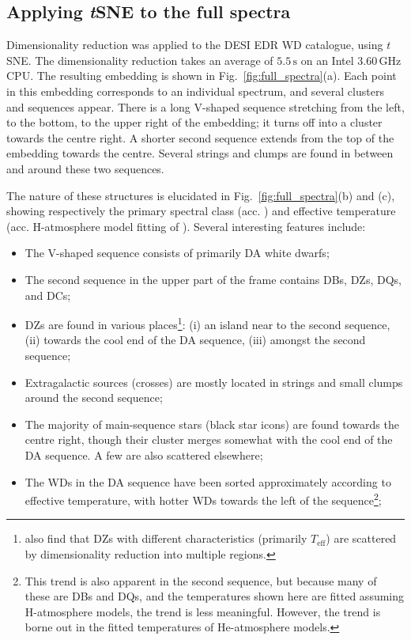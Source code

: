 \documentclass[fleqn,usenatbib]{mnras}
\def\Teff{T_\mathrm{eff}}
\begin{document}
\subsection{Applying \textit{t}SNE to the full spectra}
\label{sec:full_spectra}

Dimensionality reduction was applied to the DESI EDR WD catalogue, using $t$SNE.
The dimensionality reduction takes an average of $5.5\,\text{s}$ on an Intel $3.60\,\text{GHz}$ CPU.
The resulting embedding is shown in Fig.~\ref{fig:full_spectra}(a).
Each point in this embedding corresponds to an individual spectrum, and
several clusters and sequences appear.
There is a long V-shaped sequence stretching from the left, to the bottom, to the upper right of the embedding; it turns off into a cluster towards the centre right.
A shorter second sequence extends from the top of the embedding towards the centre.
Several strings and clumps are found in between and around these two sequences.

The nature of these structures is elucidated in Fig.~\ref{fig:full_spectra}(b) and (c), showing respectively the primary spectral class (acc. \citealt{manser24}) and effective temperature (acc. H-atmosphere model fitting of \citealt{gentilefusillo19}).
Several interesting features include:
\begin{itemize}
\item
The V-shaped sequence consists of primarily DA white dwarfs;
\item
The second sequence in the upper part of the frame contains DBs, DZs, DQs, and DCs;
\item
DZs are found in various places\footnote{
    \citet{kao24} also find that DZs with different characteristics (primarily $\Teff$) are scattered by dimensionality reduction into multiple regions.
}: (i) an island near to the second sequence, (ii) towards the cool end of the DA sequence, (iii) amongst the second sequence;
\item
Extragalactic sources (crosses) are mostly located in strings and small clumps around the second sequence;
\item
The majority of main-sequence stars (black star icons) are found towards the centre right, though their cluster merges somewhat with the cool end of the DA sequence.
A few are also scattered elsewhere;
\item
The WDs in the DA sequence have been sorted approximately according to effective temperature, with hotter WDs towards the left of the sequence\footnote{
    This trend is also apparent in the second sequence, but because many of these are DBs and DQs, and the temperatures shown here are fitted assuming H-atmosphere models, the trend is less meaningful.
    However, the trend is borne out in the fitted temperatures of He-atmosphere models.
};
\end{itemize}
\end{document}
